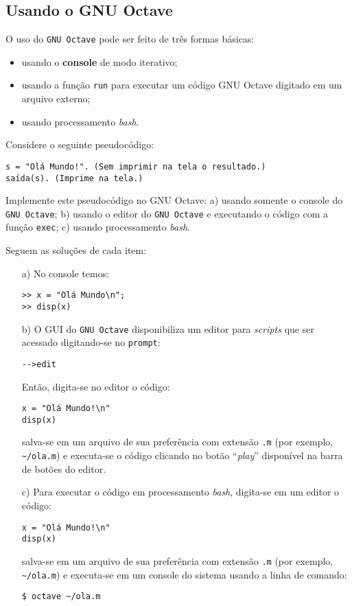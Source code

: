 \subsection{Usando o GNU Octave}

O uso do \verb+GNU Octave+ pode ser feito de três formas básicas:
\begin{itemize}
\item usando o {\bf console} de modo iterativo;
\item usando a função \verb+run+ para executar um código GNU Octave digitado em um arquivo externo;
\item usando processamento {\it bash}.
\end{itemize}

\begin{ex}
  Considere o seguinte pseudocódigo:
\begin{verbatim}
s = "Olá Mundo!". (Sem imprimir na tela o resultado.)
saída(s). (Imprime na tela.)
\end{verbatim}
Implemente este pseudocódigo no GNU Octave: a) usando somente o console do \verb+GNU Octave+; b) usando o editor do \verb+GNU Octave+ e executando o código com a função \verb+exec+; c) usando processamento {\it bash}.
\end{ex}
\begin{sol} Seguem as soluções de cada item:
  \begin{itemize}
  \item[a)]  No console temos:
\begin{verbatim}
>> x = "Olá Mundo\n";
>> disp(x)
\end{verbatim}
  \item[b)] O GUI do \verb+GNU Octave+ disponibiliza um editor para {\it scripts} que ser acessado digitando-se no \verb+prompt+:
\begin{verbatim}
-->edit
\end{verbatim}
Então, digita-se no editor o código:
\begin{verbatim}
x = "Olá Mundo!\n"
disp(x)
\end{verbatim}
salva-se em um arquivo de sua preferência com extensão \verb+.m+ (por exemplo, \verb+~/ola.m+) e executa-se o código clicando no botão ``{\it play}'' disponível na barra de botões do editor.
\item[c)] Para executar o código em processamento {\it bash}, digita-se em um editor o código:
\begin{verbatim}
x = "Olá Mundo!\n"
disp(x)
\end{verbatim}
salva-se em um arquivo de sua preferência com extensão \verb+.m+ (por exemplo, \verb+~/ola.m+) e executa-se em um console do sistema usando a linha de comando:
\begin{verbatim}
$ octave ~/ola.m
\end{verbatim}
\end{itemize}
\end{sol}

